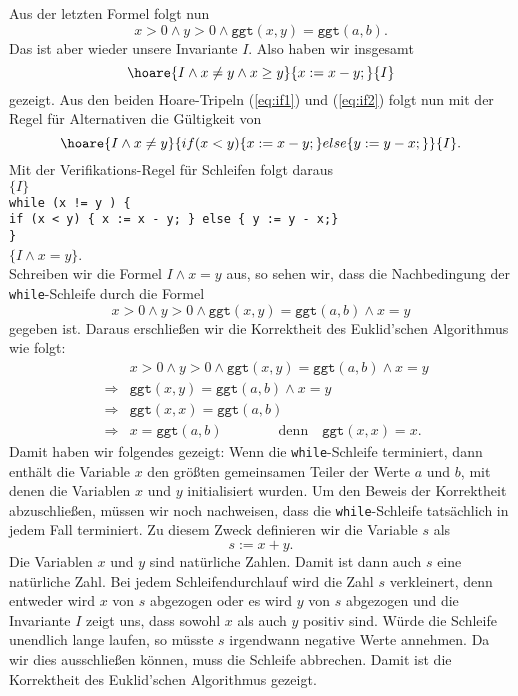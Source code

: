 Aus der letzten Formel folgt nun
\[ x > 0 \wedge y > 0 \wedge \texttt{ggt}(x,y) = \texttt{ggt}(a,b). \]
Das ist aber wieder unsere Invariante $I$.  Also haben wir insgesamt
\begin{equation}
  \label{eq:if2}
  \hoare{I \wedge x \not= y \wedge x \geq y}{x := x - y;}{I} 
\end{equation}
gezeigt.  Aus den beiden Hoare-Tripeln (\ref{eq:if1}) und (\ref{eq:if2})
folgt nun mit der Regel f\"ur Alternativen die G\"ultigkeit von
\[
  \hoare{I \wedge x \not= y}{if (x < y) \{ x := x - y; \} else \{ y := y - x;\}}{I}. 
\]
Mit der Verifikations-Regel f\"ur Schleifen folgt daraus
\\[0.2cm]
\hspace*{1.3cm} 
$\{ I \}$
\\[0.1cm]
\hspace*{2.2cm}
\texttt{while (x != y ) \{} \\[0.1cm]
\hspace*{3.2cm}
         \texttt{if (x < y) \{ x := x - y; \} else \{ y := y - x;\}}
\\[0.1cm]
\hspace*{2.2cm}
\texttt{\}} \quad 
\\[0.1cm]
\hspace*{1.3cm}
$\{ I \wedge x = y \}$. 
\\[0.2cm]
Schreiben wir die Formel $I \wedge x = y$ aus, so sehen wir, dass die Nachbedingung der
\texttt{while}-Schleife durch die Formel
\[ 
   x > 0 \wedge y > 0 \wedge \texttt{ggt}(x,y) = \texttt{ggt}(a,b) \wedge x = y
\]
gegeben ist.  Daraus erschlie{\ss}en wir die Korrektheit des Euklid'schen Algorithmus wie folgt:
\begin{eqnarray*}
&             &  x > 0 \wedge y > 0 \wedge \texttt{ggt}(x,y) = \texttt{ggt}(a,b) \wedge x = y \\
& \Rightarrow & \texttt{ggt}(x,y) = \texttt{ggt}(a,b) \wedge x = y \\
& \Rightarrow & \texttt{ggt}(x,x) = \texttt{ggt}(a,b)  \\
& \Rightarrow & x = \texttt{ggt}(a,b) \qquad\qquad \mathrm{denn} \quad \texttt{ggt}(x,x) = x.
\end{eqnarray*}
Damit haben wir folgendes gezeigt:  Wenn die \texttt{while}-Schleife terminiert, dann
enth\"alt die Variable $x$ den gr\"o{\ss}ten gemeinsamen Teiler der Werte $a$ und $b$, mit denen
die Variablen $x$ und $y$ initialisiert wurden.  Um den Beweis der Korrektheit
abzuschlie{\ss}en, m\"ussen wir noch nachweisen, dass die \texttt{while}-Schleife tats\"achlich in
jedem Fall terminiert.  Zu diesem Zweck definieren wir die Variable $s$ als
\[ s := x + y. \]
Die Variablen $x$ und $y$ sind nat\"urliche Zahlen.  Damit ist dann auch $s$ eine nat\"urliche Zahl.
Bei jedem Schleifendurchlauf wird die Zahl $s$ verkleinert, denn entweder wird $x$ von $s$
abgezogen oder es wird $y$ von $s$ abgezogen und die Invariante $I$ zeigt uns, dass sowohl $x$ als auch $y$
positiv sind.  W\"urde die Schleife unendlich lange laufen, so m\"usste $s$ irgendwann negative
Werte annehmen.  Da wir dies ausschlie{\ss}en k\"onnen, muss die
Schleife abbrechen.  Damit ist die Korrektheit des Euklid'schen Algorithmus gezeigt.
\pagebreak


